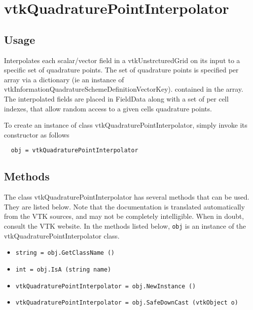 \section{vtkQuadraturePointInterpolator}

\subsection{Usage}


 Interpolates each scalar/vector field in a vtkUnstrcturedGrid
 on its input to a specific set of quadrature points. The
 set of quadrature points is specified per array via a 
 dictionary (ie an instance of vtkInformationQuadratureSchemeDefinitionVectorKey). 
 contained in the array. The interpolated fields are placed
 in FieldData along with a set of per cell indexes, that allow 
 random access to a given cells quadrature points.


To create an instance of class vtkQuadraturePointInterpolator, simply
invoke its constructor as follows
\begin{verbatim}
  obj = vtkQuadraturePointInterpolator
\end{verbatim}
\subsection{Methods}

The class vtkQuadraturePointInterpolator has several methods that can be used.
  They are listed below.
Note that the documentation is translated automatically from the VTK sources,
and may not be completely intelligible.  When in doubt, consult the VTK website.
In the methods listed below, \verb|obj| is an instance of the vtkQuadraturePointInterpolator class.
\begin{itemize}
\item  \verb|string = obj.GetClassName ()|

\item  \verb|int = obj.IsA (string name)|

\item  \verb|vtkQuadraturePointInterpolator = obj.NewInstance ()|

\item  \verb|vtkQuadraturePointInterpolator = obj.SafeDownCast (vtkObject o)|

\end{itemize}
